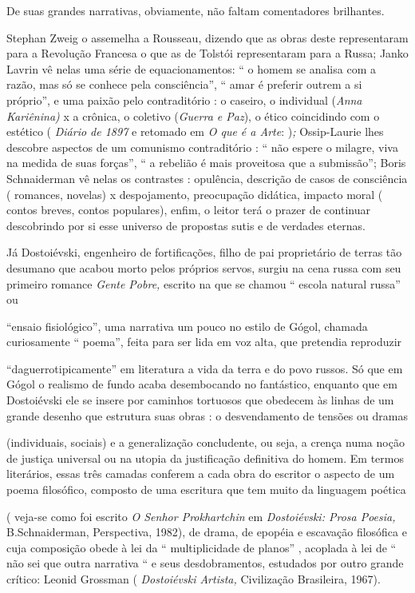 De suas grandes narrativas, obviamente, não faltam comentadores
brilhantes.

Stephan Zweig o assemelha a Rousseau, dizendo que as obras deste
representaram para a Revolução Francesa o que as de Tolstói
representaram para a Russa; Janko Lavrin vê nelas uma série de
equacionamentos: `` o homem se analisa com a razão, mas só se conhece
pela consciência'', `` amar é preferir outrem a si próprio'', e uma
paixão pelo contraditório : o caseiro, o individual (\emph{Anna
Kariênina)} x a crônica, o coletivo (\emph{Guerra e Paz}), o ético
coincidindo com o estético ( \emph{Diário de 1897} e retomado em \emph{O
que é a Arte}: )\emph{;} Ossip-Laurie lhes descobre aspectos de um
comunismo contraditório : `` não espere o milagre, viva na medida de
suas forças'', `` a rebelião é mais proveitosa que a submissão''; Boris
Schnaiderman vê nelas os contrastes : opulência, descrição de casos de
consciência ( romances, novelas) x despojamento, preocupação didática,
impacto moral ( contos breves, contos populares), enfim, o leitor terá o
prazer de continuar descobrindo por si esse universo de propostas sutis
e de verdades eternas.

Já Dostoiévski, engenheiro de fortificações, filho de pai proprietário
de terras tão desumano que acabou morto pelos próprios servos, surgiu na
cena russa com seu primeiro romance \emph{Gente Pobre,} escrito na que
se chamou `` escola natural russa'' ou

``ensaio fisiológico'', uma narrativa um pouco no estilo de Gógol,
chamada curiosamente `` poema'', feita para ser lida em voz alta, que
pretendia reproduzir

``daguerrotipicamente'' em literatura a vida da terra e do povo russos.
Só que em Gógol o realismo de fundo acaba desembocando no fantástico,
enquanto que em Dostoiévski ele se insere por caminhos tortuosos que
obedecem às linhas de um grande desenho que estrutura suas obras : o
desvendamento de tensões ou dramas

(individuais, sociais) e a generalização concludente, ou seja, a crença
numa noção de justiça universal ou na utopia da justificação definitiva
do homem. Em termos literários, essas três camadas conferem a cada obra
do escritor o aspecto de um poema filosófico, composto de uma escritura
que tem muito da linguagem poética

( veja-se como foi escrito \emph{O Senhor Prokhartchin} em
\emph{Dostoiévski: Prosa Poesia,} B.Schnaiderman, Perspectiva, 1982), de
drama, de epopéia e escavação filosófica e cuja composição obede à lei
da `` multiplicidade de planos'' , acoplada à lei de `` não sei que
outra narrativa `` e seus desdobramentos, estudados por outro grande
crítico: Leonid Grossman ( \emph{Dostoiévski Artista,} Civilização
Brasileira, 1967).

